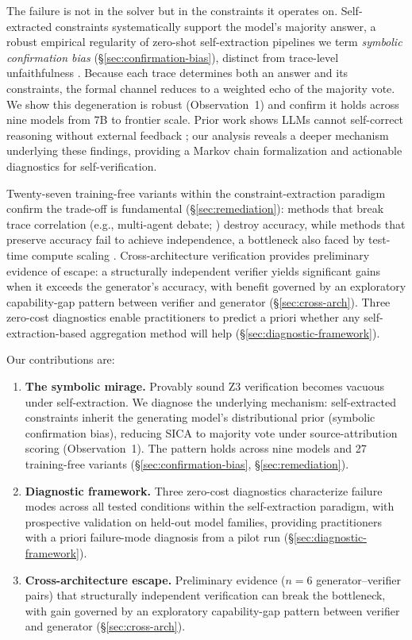 The failure is not in the solver but in the constraints it operates on. Self-extracted constraints systematically support the model's majority answer, a robust empirical regularity of zero-shot self-extraction pipelines we term \emph{symbolic confirmation bias} (\S\ref{sec:confirmation-bias}), distinct from trace-level unfaithfulness \citep{turpin2023language, wan2025unveiling}. Because each trace determines both an answer and its constraints, the formal channel reduces to a weighted echo of the majority vote. We show this degeneration is robust (Observation~1) and confirm it holds across nine models from 7B to frontier scale. Prior work shows LLMs cannot self-correct reasoning without external feedback \citep{huang2024selfcorrect, kamoi2024selfcorrect}; our analysis reveals a deeper mechanism underlying these findings, providing a Markov chain formalization and actionable diagnostics for self-verification.

Twenty-seven training-free variants within the constraint-extraction paradigm confirm the trade-off is fundamental (\S\ref{sec:remediation}): methods that break trace correlation (e.g., multi-agent debate; \citealp{liang2023encouraging, du2023improving}) destroy accuracy, while methods that preserve accuracy fail to achieve independence, a bottleneck also faced by test-time compute scaling \citep{snell2025scaling}. Cross-architecture verification provides preliminary evidence of escape: a structurally independent verifier yields significant gains when it exceeds the generator's accuracy, with benefit governed by an exploratory capability-gap pattern between verifier and generator (\S\ref{sec:cross-arch}). Three zero-cost diagnostics enable practitioners to predict a priori whether any self-extraction-based aggregation method will help (\S\ref{sec:diagnostic-framework}).

Our contributions are:
\begin{enumerate}[nosep,leftmargin=*]
\item \textbf{The symbolic mirage.} Provably sound Z3 verification becomes vacuous under self-extraction. We diagnose the underlying mechanism: self-extracted constraints inherit the generating model's distributional prior (symbolic confirmation bias), reducing SICA to majority vote under source-attribution scoring (Observation~1). The pattern holds across nine models and 27 training-free variants (\S\ref{sec:confirmation-bias}, \S\ref{sec:remediation}).

\item \textbf{Diagnostic framework.} Three zero-cost diagnostics characterize failure modes across all tested conditions within the self-extraction paradigm, with prospective validation on held-out model families, providing practitioners with a priori failure-mode diagnosis from a pilot run (\S\ref{sec:diagnostic-framework}).

\item \textbf{Cross-architecture escape.} Preliminary evidence ($n{=}6$ generator--verifier pairs) that structurally independent verification can break the bottleneck, with gain governed by an exploratory capability-gap pattern between verifier and generator (\S\ref{sec:cross-arch}).
\end{enumerate}

